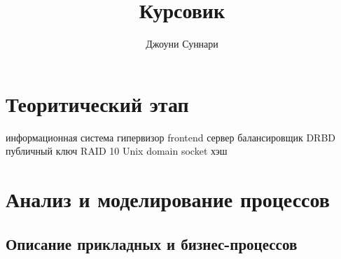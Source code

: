 \documentclass{article}
\author{Джоуни Суннари}
\title{Курсовик}
\begin{document}
\maketitle
\pagebreak
\tableofcontents
\pagebreak

\newcommand{\myparagraph}[1]{\paragraph{#1}\mbox{}\\}

\section{Теоритический этап}
информационная система
гипервизор
frontend сервер
балансировщик
DRBD
публичный ключ
RAID 10
Unix domain socket
хэш

\pagebreak

\section{Анализ и моделирование процессов}


\subsection{Описание прикладных и бизнес-процессов}
\end{document}
